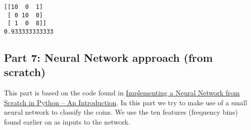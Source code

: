 \documentclass[11pt]{article}
\begin{document}
    \begin{Verbatim}[commandchars=\\\{\}]
[[10  0  1]
 [ 0 10  0]
 [ 1  0  8]]
0.933333333333

    \end{Verbatim}

    \subsection{Part 7: Neural Network approach (from
scratch)}\label{part-7-neural-network-approach-from-scratch}

This part is based on the code found in
\href{http://www.wildml.com/2015/09/implementing-a-neural-network-from-scratch/}{Implementing
a Neural Network from Scratch in Python -- An Introduction}. In this
part we try to make use of a small neural network to classify the coins.
We use the ten features (frequency bins) found earlier on as inputs to
the network.
\end{document}
